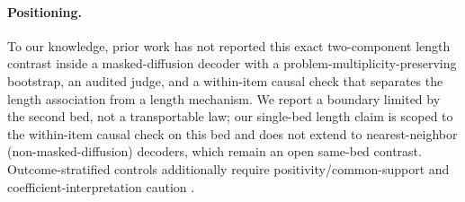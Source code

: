 \documentclass{article}
\begin{document}
\paragraph{Positioning.}
To our knowledge, prior work has not reported this exact two-component length
contrast inside a masked-diffusion decoder with a problem-multiplicity-preserving
bootstrap, an audited judge, and a within-item causal check that separates the
length association from a length mechanism.  We report a boundary limited by the
second bed, not a transportable law; our single-bed length claim is scoped to the
within-item causal check on this bed and does not extend to nearest-neighbor
(non-masked-diffusion) decoders, which remain an open same-bed contrast.
Outcome-stratified controls additionally require
positivity/common-support and coefficient-interpretation caution
\citep{petersen2012positivity,westreich2013table2fallacy}.
\end{document}
